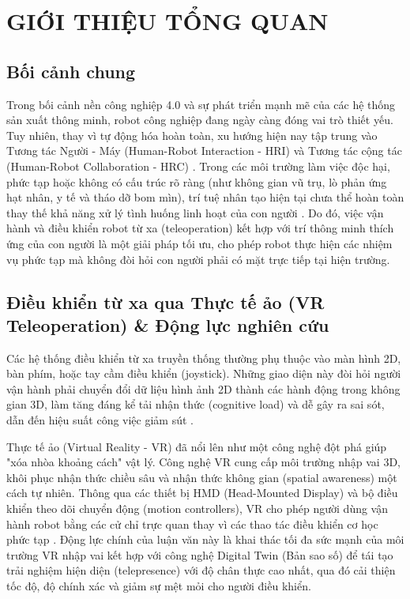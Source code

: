 \chapter{GIỚI THIỆU TỔNG QUAN}
\label{chap:intro}

\section{Bối cảnh chung}
Trong bối cảnh nền công nghiệp 4.0 và sự phát triển mạnh mẽ của các hệ thống sản xuất thông minh, robot công nghiệp đang ngày càng đóng vai trò thiết yếu. Tuy nhiên, thay vì tự động hóa hoàn toàn, xu hướng hiện nay tập trung vào Tương tác Người - Máy (Human-Robot Interaction - HRI) và Tương tác cộng tác (Human-Robot Collaboration - HRC) \cite{zhang2023research}. Trong các môi trường làm việc độc hại, phức tạp hoặc không có cấu trúc rõ ràng (như không gian vũ trụ, lò phản ứng hạt nhân, y tế và tháo dỡ bom mìn), trí tuệ nhân tạo hiện tại chưa thể hoàn toàn thay thế khả năng xử lý tình huống linh hoạt của con người \cite{hetrick2020comparing, luu2025enhancing}. Do đó, việc vận hành và điều khiển robot từ xa (teleoperation) kết hợp với trí thông minh thích ứng của con người là một giải pháp tối ưu, cho phép robot thực hiện các nhiệm vụ phức tạp mà không đòi hỏi con người phải có mặt trực tiếp tại hiện trường.

\section{Điều khiển từ xa qua Thực tế ảo (VR Teleoperation) \& Động lực nghiên cứu}
Các hệ thống điều khiển từ xa truyền thống thường phụ thuộc vào màn hình 2D, bàn phím, hoặc tay cầm điều khiển (joystick). Những giao diện này đòi hỏi người vận hành phải chuyển đổi dữ liệu hình ảnh 2D thành các hành động trong không gian 3D, làm tăng đáng kể tải nhận thức (cognitive load) và dễ gây ra sai sót, dẫn đến hiệu suất công việc giảm sút \cite{hetrick2020comparing}. 

Thực tế ảo (Virtual Reality - VR) đã nổi lên như một công nghệ đột phá giúp "xóa nhòa khoảng cách" vật lý. Công nghệ VR cung cấp môi trường nhập vai 3D, khôi phục nhận thức chiều sâu và nhận thức không gian (spatial awareness) một cách tự nhiên. Thông qua các thiết bị HMD (Head-Mounted Display) và bộ điều khiển theo dõi chuyển động (motion controllers), VR cho phép người dùng vận hành robot bằng các cử chỉ trực quan thay vì các thao tác điều khiển cơ học phức tạp \cite{chen2023comparing, torrejón2026teleoperation}. Động lực chính của luận văn này là khai thác tối đa sức mạnh của môi trường VR nhập vai kết hợp với công nghệ Digital Twin (Bản sao số) để tái tạo trải nghiệm hiện diện (telepresence) với độ chân thực cao nhất, qua đó cải thiện tốc độ, độ chính xác và giảm sự mệt mỏi cho người điều khiển.

